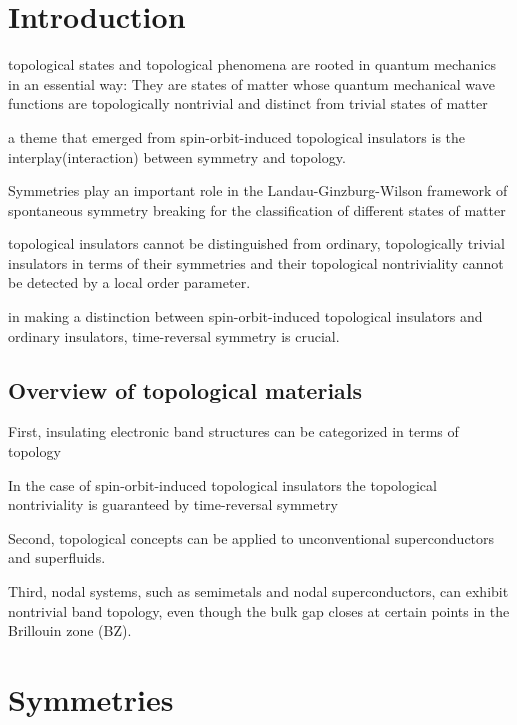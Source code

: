 \section{Introduction}
topological states and topological phenomena are rooted in quantum mechanics in an essential way: They are states of matter whose quantum mechanical wave functions are topologically nontrivial and distinct from trivial states of matter\par
a theme that emerged from spin-orbit-induced topological insulators is the interplay(interaction) between symmetry and topology. \par
Symmetries play an important role in the Landau-Ginzburg-Wilson framework of spontaneous symmetry breaking for the classification of different states of matter\par
topological insulators cannot be distinguished from ordinary, topologically trivial
insulators in terms of their symmetries and their topological
nontriviality cannot be detected by a local order parameter.\par
in making a distinction between spin-orbit-induced
topological insulators and ordinary insulators, time-reversal
symmetry is crucial.\par

\subsection{Overview of topological materials}
First, insulating electronic band structures can be categorized
in terms of topology\par
In the case of spin-orbit-induced topological insulators
the topological nontriviality is guaranteed by time-reversal
symmetry\par
Second, topological concepts can be applied to unconventional
superconductors and superfluids.\par
Third, nodal systems, such as semimetals and nodal superconductors,
can exhibit nontrivial band topology, even though the bulk gap closes at certain points in the Brillouin zone (BZ).\par

\section{Symmetries}

